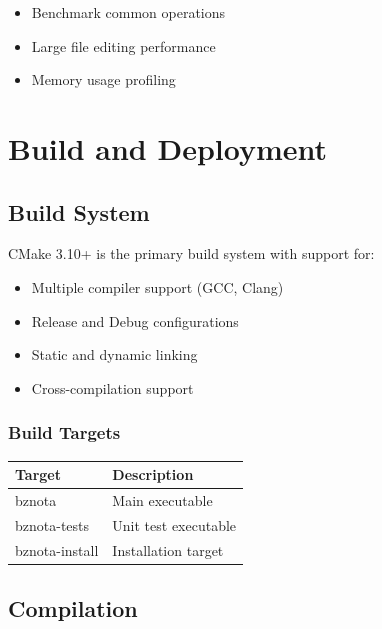 \documentclass[12pt,a4paper,oneside,openany]{report}
\begin{document}
\begin{itemize}
	\item Benchmark common operations
	\item Large file editing performance
	\item Memory usage profiling
\end{itemize}

\chapter{Build and Deployment}

\section{Build System}

CMake 3.10+ is the primary build system with support for:

\begin{itemize}
	\item Multiple compiler support (GCC, Clang)
	\item Release and Debug configurations
	\item Static and dynamic linking
	\item Cross-compilation support
\end{itemize}

\subsection{Build Targets}

\begin{table}[H]
	\centering
	\begin{tabular}{|l|p{6cm}|}
		\hline
		\textbf{Target} & \textbf{Description} \\
		\hline
		bznota          & Main executable      \\
		\hline
		bznota-tests    & Unit test executable \\
		\hline
		bznota-install  & Installation target  \\
		\hline
	\end{tabular}
\end{table}

\section{Compilation}
\end{document}
